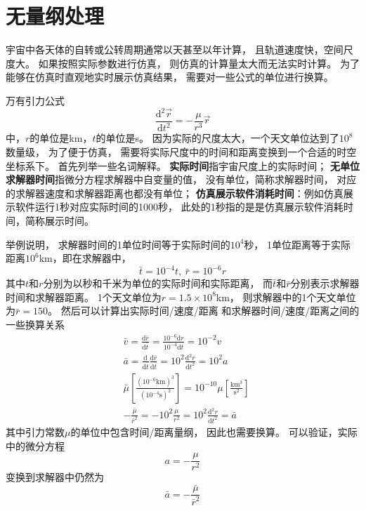 \section{无量纲处理}
宇宙中各天体的自转或公转周期通常以天甚至以年计算，
且轨道速度快，空间尺度大。
如果按照实际参数进行仿真，
则仿真的计算量太大而无法实时计算。
为了能够在仿真时直观地实时展示仿真结果，
需要对一些公式的单位进行换算。

万有引力公式
\begin{equation*}
    \frac{\text{d}^2\vec{r}}{\text{d}t^2}=-\frac{\mu}{r^3}\vec{r}
\end{equation*}
中，$r$的单位是km，$t$的单位是s。
因为实际的尺度太大，一个天文单位达到了$10^8$数量级，
为了便于仿真，
需要将实际尺度中的时间和距离变换到一个合适的时空坐标系下。
首先列举一些名词解释。
\textbf{实际时间}指宇宙尺度上的实际时间；
\textbf{无单位求解器时间}指微分方程求解器中自变量的值，
没有单位，简称求解器时间，
对应的求解器速度和求解器距离也都没有单位；
\textbf{仿真展示软件消耗时间}：例如仿真展示软件运行1秒对应实际时间的1000秒，
此处的1秒指的是是仿真展示软件消耗时间，简称展示时间。

举例说明，
求解器时间的1单位时间等于实际时间的$10^4$秒，
1单位距离等于实际距离$10^6$km，即在求解器中，
\begin{equation}
    \bar{t}=10^{-4}t,\ \bar{r}=10^{-6}r \label{eqRealConvert}
\end{equation}
其中$t$和$r$分别为以秒和千米为单位的实际时间和实际距离，
而$\bar{t}$和$\bar{r}$分别表示求解器时间和求解器距离。
1个天文单位为$r=1.5\times10^8$km，
则求解器中的1个天文单位为$\bar{r}=150$。
然后可以计算出实际时间/速度/距离
和求解器时间/速度/距离之间的一些换算关系
\begin{align*}
&\bar{v} = \frac{\text{d}\bar{r}}{\text{d}\bar{t}}
 = \frac{10^{-6}\text{d}r}{10^{-4}\text{d}t} = 10^{-2}v \\
&\bar{a} = \frac{\text{d}}{\text{d}\bar{t}}\frac{\text{d}\bar{r}}{\text{d}\bar{t}}
 = 10^2\frac{\text{d}^2r}{\text{d}t^2} = 10^2a \\
&\bar{\mu}\left[\frac{(10^{-6}\text{km})^3}{(10^{-4}\text{s})^2}\right]
 = 10^{-10}\mu\left[\frac{\text{km}^3}{\text{s}^2}\right] \\
&-\frac{\bar{\mu}}{\bar{r}^2} = -10^2\frac{\mu}{r^2}
 = 10^2\frac{\text{d}^2r}{\text{d}t^2} = \bar{a}
\end{align*}
其中引力常数$\mu$的单位中包含时间/距离量纲，
因此也需要换算。
可以验证，实际中的微分方程
$$a=-\frac{\mu}{r^2}$$
变换到求解器中仍然为
$$\bar{a}=-\frac{\bar{\mu}}{\bar{r}^2}$$

